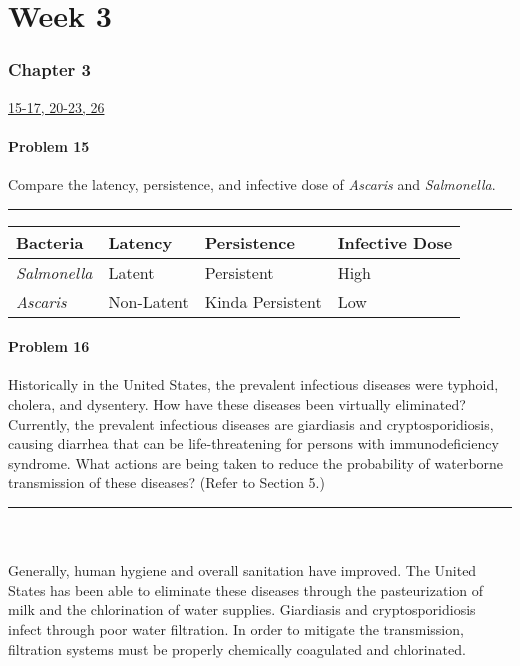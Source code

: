 \part*{Week 3}
\section*{Chapter 3}
\underline{15-17, 20-23, 26}
\subsection*{Problem 15}
Compare the latency, persistence, and infective dose of \emph{Ascaris} and \emph{Salmonella}.
\\\rule{5cm}{1pt}
\begin{center}
    \renewcommand{\arraystretch}{1.2}
    \begin{tabular}{l l l l}
        \textbf{Bacteria} & \textbf{Latency} & \textbf{Persistence} & \textbf{Infective Dose} \\
        \hline
        \emph{Salmonella} & Latent & Persistent & High \\
        \emph{Ascaris} & Non-Latent & Kinda Persistent & Low
    \end{tabular}
\end{center}
\subsection*{Problem 16}
Historically in the United States, the prevalent infectious diseases were typhoid, cholera, and dysentery. How have these diseases been virtually eliminated? Currently, the prevalent infectious diseases are giardiasis and cryptosporidiosis, causing diarrhea that can be life-threatening for persons with immunodeficiency syndrome. What actions are being taken to reduce the probability of waterborne transmission of these diseases? (Refer to Section 5.)\\
\rule{5cm}{1pt}
\\\\Generally, human hygiene and overall sanitation have improved. The United States has been able to eliminate these diseases through the pasteurization of milk and the chlorination of water supplies. Giardiasis and cryptosporidiosis infect through poor water filtration. In order to mitigate the transmission, filtration systems must be properly chemically coagulated and chlorinated. 
